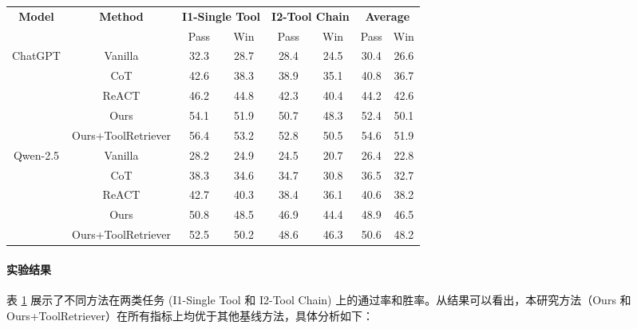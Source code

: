 \begin{table}[!ht]
  \centering
  \begin{tabular}{c|c|cc|cc|cc}
  \toprule
  \textbf{Model} & \textbf{Method} & \multicolumn{2}{c|}{\textbf{I1-Single Tool}} & \multicolumn{2}{c|}{\textbf{I2-Tool Chain}} & \multicolumn{2}{c}{\textbf{Average}} \\
  & & Pass & Win & Pass & Win & Pass & Win \\
  \midrule
  ChatGPT & Vanilla          & 32.3 & 28.7 & 28.4 & 24.5 & 30.4 & 26.6 \\
          & CoT              & 42.6 & 38.3 & 38.9 & 35.1 & 40.8 & 36.7 \\
          & ReACT            & 46.2 & 44.8 & 42.3 & 40.4 & 44.2 & 42.6 \\
          & Ours             & 54.1 & 51.9 & 50.7 & 48.3 & 52.4 & 50.1 \\
          & Ours+ToolRetriever & 56.4 & 53.2 & 52.8 & 50.5 & 54.6 & 51.9 \\
  \midrule
  Qwen-2.5 & Vanilla          & 28.2 & 24.9 & 24.5 & 20.7 & 26.4 & 22.8 \\
           & CoT              & 38.3 & 34.6 & 34.7 & 30.8 & 36.5 & 32.7 \\
           & ReACT            & 42.7 & 40.3 & 38.4 & 36.1 & 40.6 & 38.2 \\
           & Ours             & 50.8 & 48.5 & 46.9 & 44.4 & 48.9 & 46.5 \\
           & Ours+ToolRetriever & 52.5 & 50.2 & 48.6 & 46.3 & 50.6 & 48.2 \\
  \bottomrule
  \end{tabular}
  \label{tab:simplified_pass_win}
\end{table}

\paragraph{实验结果}

表 \ref{tab:simplified_pass_win} 展示了不同方法在两类任务 (I1-Single Tool 和 I2-Tool Chain) 上的通过率和胜率。从结果可以看出，本研究方法（Ours 和 Ours+ToolRetriever）在所有指标上均优于其他基线方法，具体分析如下：

